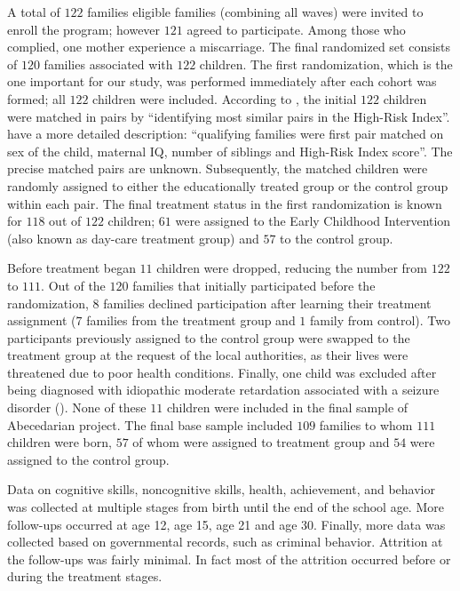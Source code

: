 A total of $122$ families eligible families (combining all waves) were invited to enroll the program; however $121$ agreed to participate.
Among those who complied, one mother experience a miscarriage. The final randomized set consists of $120$ families associated with $122$ children. The first randomization, which is the one important for our study, was performed immediately after each cohort was formed; all $122$ children were included. According to \citet{Ramey_Campbell_1984}, the initial $122$ children were matched in pairs by ``identifying most similar pairs in the High-Risk Index''. \citet{Breitmayer_Ramey_1986_CD} have a more detailed description: ``qualifying families were first pair matched on sex of the child, maternal IQ, number of siblings and High-Risk Index score''. The precise matched pairs are unknown. Subsequently, the matched children were randomly assigned to either the educationally treated group or the control group within each pair. The final treatment status in the first randomization is known for $118$ out of $122$ children; $61$ were assigned to the Early Childhood Intervention (also known as day-care treatment group) and $57$ to the control group.

Before treatment began $11$ children were dropped, reducing the number from $122$ to $111$. Out of the $120$ families that initially participated before the randomization, $8$ families declined participation after learning their treatment assignment ($7$ families from the treatment group and $1$ family from control). Two participants previously assigned to the control group were swapped to the treatment group at the request of the local authorities,
as their lives were threatened due to poor health conditions. Finally, one child was excluded after being diagnosed with idiopathic moderate retardation associated with a seizure disorder (\citet{Campbell_Ramey_1995_AERJ}). None of these $11$ children were included in the final sample of Abecedarian project. The final base sample included $109$ families to whom $111$ children were born, $57$ of whom were assigned to treatment group and $54$ were assigned to the control group.

Data on cognitive skills, noncognitive skills, health, achievement, and behavior was collected at multiple stages from birth until the end of the school age. More follow-ups occurred at age 12, age 15, age 21 and age 30. Finally, more data was collected based on governmental records, such as criminal behavior. Attrition at the follow-ups was fairly minimal. In fact most of the attrition occurred before or during the treatment stages. 

